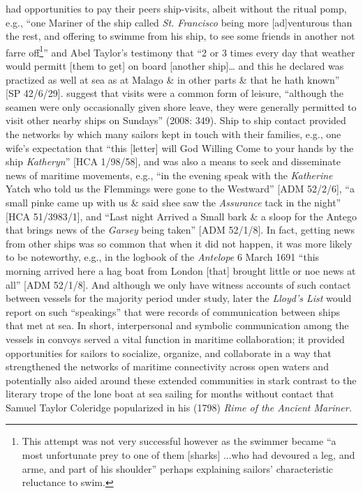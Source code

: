 had opportunities to pay their peers ship-visits, albeit without the ritual pomp, e.g., “one Mariner of the ship called \textit{St. Francisco} being more [ad]venturous than the rest, and offering to swimme from his ship, to see some friends in another not farre off\footnote{This attempt was not very successful however as the swimmer became “a most unfortunate prey to one of them [sharks] ...who had devoured a leg, and arme, and part of his shoulder” \citep[21]{Gage1648} perhaps explaining sailors’ characteristic reluctance to swim.}” \citep[21,]{Gage1648} and Abel Taylor’s testimony that “2 or 3 times every day that weather would permitt [them to get] on board [another ship]… and this he declared was practized as well at sea as at Malago \& in other parts \& that he hath known” [SP 42/6/29]. \citeauthor{AdkinsAdkins2008} suggest that  visits were a common form of leisure, “although the seamen were only occasionally given shore leave, they were generally permitted to visit other nearby ships on Sundays” (2008: 349). Ship to ship contact provided the networks by which many sailors kept in touch with their families, e.g., one wife’s expectation that “this [letter] will God Willing Come to your hands by the ship \textit{Katheryn}” [HCA 1/98/58], and was also a means to seek and disseminate news of maritime movements, e.g., “in the evening speak with the \textit{Katherine} Yatch who told us the Flemmings were gone to the Westward” [ADM 52/2/6], “a small pinke came up with us \& said shee saw the \textit{Assurance} tack in the night” [HCA 51/3983/1], and “Last night Arrived a Small bark \& a sloop for the Antego that brings news of the \textit{Garsey} being taken” [ADM 52/1/8]. In fact, getting news from other ships was so common that when it did not happen, it was more likely to be noteworthy, e.g., in the logbook of the \textit{Antelope} 6 March {1691} “this morning arrived here a hag boat from London [that] brought little or noe news at all” [ADM 52/1/8]. And although we only have witness accounts of such contact between vessels for the majority period under study, later the \textit{Lloyd's List} would report on such “speakings” that were records of communication between ships that met at sea. In short, interpersonal and symbolic communication among the vessels in convoys served a vital function in maritime collaboration; it provided opportunities for sailors to socialize, organize, and collaborate in a way that strengthened the networks of maritime connectivity across open waters and potentially also aided  around these extended communities in stark contrast to the literary trope of the lone boat at sea sailing for months without contact that Samuel Taylor Coleridge popularized in his (1798) \textit{Rime of the Ancient Mariner.} 

